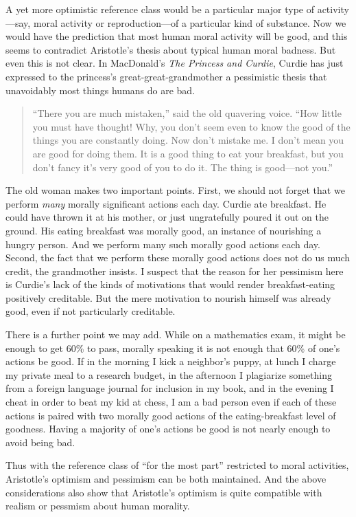 A yet more optimistic reference class would be a particular major type of activity---say, moral activity or reproduction---of
a particular kind of substance. Now we would have the prediction that most human moral activity will be good, and this seems
to contradict Aristotle's thesis about typical human moral badness. But even this is not clear. In MacDonald's 
\textit{The Princess and Curdie}, Curdie has just expressed to the princess's great-great-grandmother a pessimistic thesis that 
unavoidably most things humans do are bad. 
\begin{quote}
``There you are much mistaken,'' said the old quavering voice. ``How little you must have thought! Why, you don't seem even to 
know the good of the things you are constantly doing. Now don't mistake me. I don't mean you are good for doing them. 
It is a good thing to eat your breakfast, but you don't fancy it's very good of you to do it. The thing is good---not you.'' \parencite[p.~32]{MacDonaldPC}
\end{quote}
The old woman makes two important points. First, we should not forget that we perform \textit{many} morally significant actions
each day. Curdie ate breakfast. He could have thrown it at his mother, or just ungratefully poured it out on the ground.
His eating breakfast was morally good, an instance of nourishing a hungry person. And we perform many such morally good actions each day. Second, the fact that we
perform these morally good actions does not do us much credit, the grandmother insists. I suspect that the reason for her
pessimism here is Curdie's lack of the kinds of motivations that would render breakfast-eating positively creditable.
But the mere motivation to nourish himself was already good, even if not particularly creditable.

There is a further point we may add. While on a mathematics exam, it might be enough to get 60\% to pass,
morally speaking it is not enough that 60\% of one's actions be good. If in the morning I kick a neighbor's puppy,
at lunch I charge my private meal to a research budget, in the afternoon I plagiarize something from a foreign
language journal for inclusion in my book, and in the evening I cheat in order to beat my kid at chess, I am a bad
person even if each of these actions is paired with two morally good actions of the eating-breakfast level of 
goodness. Having a majority of one's actions be good is not nearly enough to avoid being bad. 

Thus with the reference class of ``for the most part'' restricted to moral activities, Aristotle's optimism and pessimism
can be both maintained. And the above considerations also show that Aristotle's optimism is quite compatible with 
realism or pessmism about human morality.

